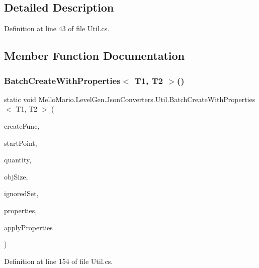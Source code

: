 \subsection{Detailed Description}


Definition at line 43 of file Util.\+cs.



\subsection{Member Function Documentation}
\mbox{\label{classMelloMario_1_1LevelGen_1_1JsonConverters_1_1Util_a385696818352351be26ed9cc16a01f91}} 
\subsubsection{Batch\+Create\+With\+Properties$<$ T1, T2 $>$()}
{\footnotesize\ttfamily static void Mello\+Mario.\+Level\+Gen.\+Json\+Converters.\+Util.\+Batch\+Create\+With\+Properties$<$ T1, T2 $>$ (\begin{DoxyParamCaption}\item[{Func$<$ Point, T1 $>$}]{create\+Func,  }\item[{Point}]{start\+Point,  }\item[{Point}]{quantity,  }\item[{Point}]{obj\+Size,  }\item[{I\+Collection$<$ Point $>$}]{ignored\+Set,  }\item[{I\+Dictionary$<$ Point, T2 $>$}]{properties,  }\item[{\textbf{ Action}$<$ \textbf{ I\+Game\+Object}, T2 $>$}]{apply\+Properties }\end{DoxyParamCaption})\hspace{0.3cm}{\ttfamily [static]}}



Definition at line 154 of file Util.\+cs.


